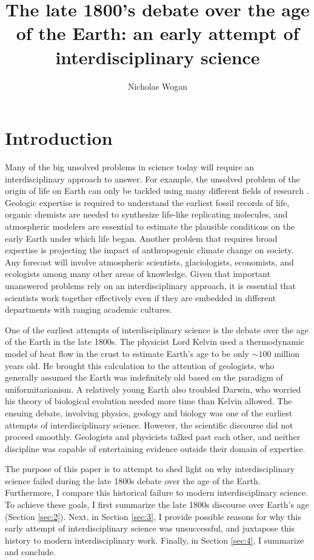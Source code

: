 \documentclass[12pt]{article}
\begin{document}
\title{The late 1800's debate over the age of the Earth: an early attempt of interdisciplinary science}
\author{Nicholas Wogan}
\maketitle

\section{Introduction}

Many of the big unsolved problems in science today will require an interdisciplinary approach to answer. For example, the unsolved problem of the origin of life on Earth can only be tackled using many different fields of research \citep{Hays_2015}. Geologic expertise is required to understand the earliest fossil records of life, organic chemists are needed to synthesize life-like replicating molecules, and atmospheric modelers are essential to estimate the plausible conditions on the early Earth under which life began. Another problem that requires broad expertise is projecting the impact of anthropogenic climate change on society. Any forecast will involve atmospheric scientists, glaciologists, economists, and ecologists among many other areas of knowledge. Given that important unanswered problems rely on an interdisciplinary approach, it is essential that scientists work together effectively even if they are embedded in different departments with ranging academic cultures.

One of the earliest attempts of interdisciplinary science is the debate over the age of the Earth in the late 1800s. The physicist Lord Kelvin used a thermodynamic model of heat flow in the crust to estimate Earth's age to be only $\sim 100$ million years old. He brought this calculation to the attention of geologists, who generally assumed the Earth was indefinitely old based on the paradigm of uniformitarianism. A relatively young Earth also troubled Darwin, who worried his theory of biological evolution needed more time than Kelvin allowed. The ensuing debate, involving physics, geology and biology was one of the earliest attempts of interdisciplinary science. However, the scientific discourse did not proceed smoothly. Geologists and physicists talked past each other, and neither discipline was capable of entertaining evidence outside their domain of expertise.

The purpose of this paper is to attempt to shed light on why interdisciplinary science failed during the late 1800s debate over the age of the Earth. Furthermore, I compare this historical failure to modern interdisciplinary science. To achieve these goals, I first summarize the late 1800s discourse over Earth's age (Section \ref{sec:2}). Next, in Section \ref{sec:3}, I provide possible reasons for why this early attempt of interdisciplinary science was unsuccessful, and juxtapose this history to modern interdisciplinary work. Finally, in Section \ref{sec:4}, I summarize and conclude.
\end{document}
